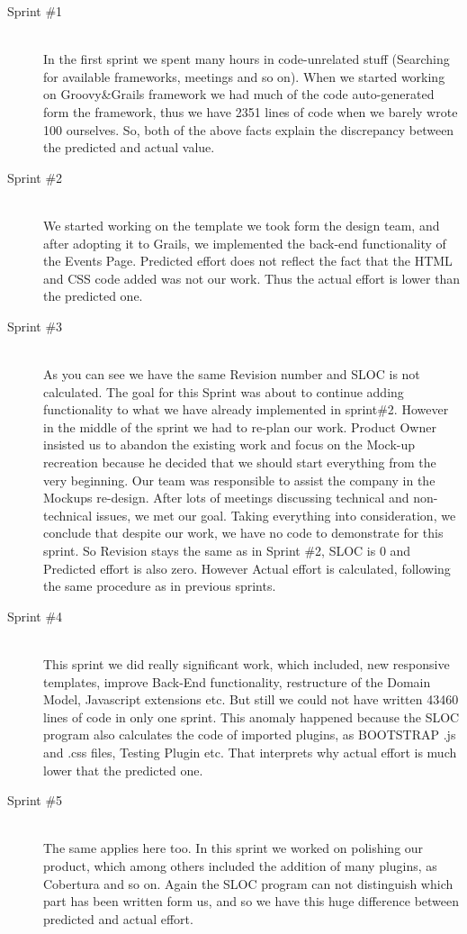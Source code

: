 \begin{description}
	\item[Sprint \#1] \hfill \\ In the first sprint we spent many hours in code-unrelated stuff (Searching for available frameworks, meetings and so on). When we started working on Groovy\&Grails framework we had much of the code auto-generated form the framework, thus we have 2351 lines of code when we barely wrote 100 ourselves. So, both of the above facts explain the discrepancy between the predicted and actual value.
	\item[Sprint \#2] \hfill \\ We started working on the template we took form the design team, and after adopting it to Grails, we implemented the back-end functionality of the Events Page. Predicted effort does not reflect the fact that the HTML and CSS code added was not our work. Thus the actual effort is lower than the predicted one.
	\item[Sprint \#3] \hfill \\ As you can see we have the same Revision number and SLOC is not calculated. The goal for this Sprint was about to continue adding functionality  to what we have already implemented in sprint\#2. However in the middle of the sprint we had to re-plan our work. Product Owner insisted us to abandon the existing work and focus on the Mock-up recreation because he decided that we should start everything from the very beginning. Our team was responsible to assist the company in the Mockups re-design. After lots of meetings discussing technical and non-technical issues, we met our goal. Taking everything into consideration, we conclude that despite our work, we have no code to demonstrate for this sprint. So Revision stays the same as in Sprint \#2, SLOC is 0 and Predicted effort is also zero. However Actual effort is calculated, following the same procedure as in previous sprints.
	\item[Sprint \#4] \hfill \\ This sprint we did really significant work, which included, new responsive templates, improve Back-End functionality, restructure of the Domain Model, Javascript extensions etc. But still we could not have written 43460 lines of code in only one sprint. This anomaly happened because the SLOC program also calculates the code of imported plugins, as BOOTSTRAP .js and .css files, Testing Plugin etc. That interprets why actual effort is much lower that the predicted one.  
	\item[Sprint \#5] \hfill \\ The same applies here too. In this sprint we worked on polishing our product, which among others included the addition of many plugins, as Cobertura and so on. Again the SLOC program can not distinguish which part has been written form us, and so we have this huge difference between predicted and actual effort. 
\end{description}

